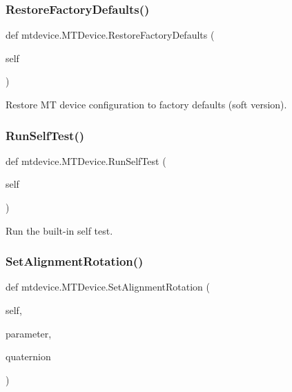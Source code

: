 \subsubsection{\texorpdfstring{Restore\+Factory\+Defaults()}{RestoreFactoryDefaults()}}
{\footnotesize\ttfamily def mtdevice.\+M\+T\+Device.\+Restore\+Factory\+Defaults (\begin{DoxyParamCaption}\item[{}]{self }\end{DoxyParamCaption})}

\begin{DoxyVerb}Restore MT device configuration to factory defaults (soft version).
\end{DoxyVerb}
 \mbox{\label{classmtdevice_1_1MTDevice_a259fb7d60c601ebe00e539c9a96ec9f7}} 
\subsubsection{\texorpdfstring{Run\+Self\+Test()}{RunSelfTest()}}
{\footnotesize\ttfamily def mtdevice.\+M\+T\+Device.\+Run\+Self\+Test (\begin{DoxyParamCaption}\item[{}]{self }\end{DoxyParamCaption})}

\begin{DoxyVerb}Run the built-in self test.\end{DoxyVerb}
 \mbox{\label{classmtdevice_1_1MTDevice_ad7f11554fdb3d2ce24d2ca081ca972c6}} 
\subsubsection{\texorpdfstring{Set\+Alignment\+Rotation()}{SetAlignmentRotation()}}
{\footnotesize\ttfamily def mtdevice.\+M\+T\+Device.\+Set\+Alignment\+Rotation (\begin{DoxyParamCaption}\item[{}]{self,  }\item[{}]{parameter,  }\item[{}]{quaternion }\end{DoxyParamCaption})}

